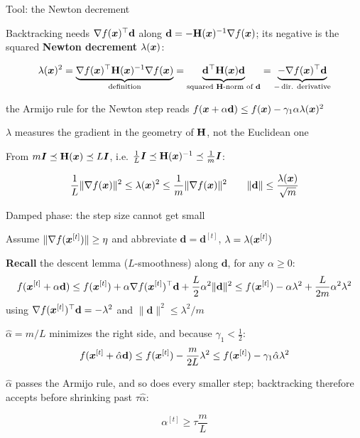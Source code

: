 \documentclass[11pt,compress,t,notes=noshow, xcolor=table]{beamer}
\begin{document}
\begin{framei}[fs=small]{Tool: the Newton decrement}
\item Backtracking needs $\nabla f(\bm{x})^\top \mathbf{d}$ along $\mathbf{d} = - \mathbf{H}(\bm{x})^{-1} \nabla f(\bm{x})$;
its negative is the squared \textbf{Newton decrement} $\lambda(\bm{x})$:
\begin{framed}
$$\lambda(\bm{x})^2 = \underbrace{\nabla f(\bm{x})^\top \mathbf{H}(\bm{x})^{-1} \nabla f(\bm{x})}_{\text{definition}}
= \underbrace{\mathbf{d}^\top \mathbf{H}(\bm{x}) \mathbf{d}}_{\text{squared } \mathbf{H}\text{-norm of } \mathbf{d}}
= \underbrace{- \nabla f(\bm{x})^\top \mathbf{d}}_{-\, \text{dir. derivative}}$$
\end{framed}
\item[$\Rightarrow$] the Armijo rule for the Newton step reads
$f(\bm{x} + \alpha \mathbf{d}) \le f(\bm{x}) - \gamma_1 \alpha \lambda(\bm{x})^2$
\item[$\Rightarrow$] $\lambda$ measures the gradient in the geometry of $\mathbf{H}$, not the Euclidean one
\item From $m \bm{I} \preceq \mathbf{H}(\bm{x}) \preceq L \bm{I}$, i.e. $\tfrac{1}{L}\bm{I} \preceq \mathbf{H}(\bm{x})^{-1} \preceq \tfrac{1}{m}\bm{I}$:
\begin{framed}
$$\frac{1}{L}\|\nabla f(\bm{x})\|^2 \le \lambda(\bm{x})^2 \le \frac{1}{m}\|\nabla f(\bm{x})\|^2
\qquad \|\mathbf{d}\| \le \frac{\lambda(\bm{x})}{\sqrt{m}}$$
\end{framed}
\end{framei}


\begin{framei}[fs=small]{Damped phase: the step size cannot get small}
\item Assume $\|\nabla f(\bm{x}^{[t]})\| \ge \eta$ and abbreviate $\mathbf{d} = \mathbf{d}^{[t]}$,
$\lambda = \lambda(\bm{x}^{[t]})$
\item \textbf{Recall} the descent lemma ($L$-smoothness) along $\mathbf{d}$, for any $\alpha \ge 0$:
$$f(\bm{x}^{[t]} + \alpha \mathbf{d}) \le f(\bm{x}^{[t]}) + \alpha \nabla f(\bm{x}^{[t]})^\top \mathbf{d}
+ \frac{L}{2}\alpha^2 \|\mathbf{d}\|^2
\le f(\bm{x}^{[t]}) - \alpha \lambda^2 + \frac{L}{2m}\alpha^2 \lambda^2$$
using $\nabla f(\bm{x}^{[t]})^\top \mathbf{d} = - \lambda^2$ and $\|\mathbf{d}\|^2 \le \lambda^2/m$
\item $\hat\alpha = m/L$ minimizes the right side, and because $\gamma_1 < \tfrac{1}{2}$:
$$f(\bm{x}^{[t]} + \hat\alpha \mathbf{d}) \le f(\bm{x}^{[t]}) - \frac{m}{2L}\lambda^2
\le f(\bm{x}^{[t]}) - \gamma_1 \hat\alpha \lambda^2$$
\item[$\Rightarrow$] $\hat\alpha$ passes the Armijo rule, and so does every smaller step; backtracking
therefore accepts before shrinking past $\tau \hat\alpha$:
\begin{framed}
$$\alpha^{[t]} \ge \tau \frac{m}{L}$$
\end{framed}
\end{framei}
\end{document}
